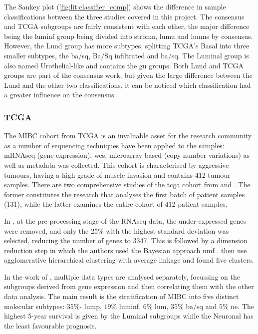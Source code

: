 The Sankey plot (\cref{fig:lit:classifier_comp}) shows the difference in sample classifications between the three studies covered in this project. The consensus and TCGA subgroups are fairly consistent with each other, the major difference being the \acrfull{luminf} group being divided into \acrfull{stroma}, \acrfull{lumu} and \acrfull{lumns} by consensus. However, the Lund group has more subtypes, splitting TCGA's Basal into three smaller subtypes, the \acrfull{ba/sq}, Ba/Sq infiltrated and \acrfull{ba/sq}. The Luminal group is also named Urothelial-like and contains the \acrfull{gu} groups. Both Lund and TCGA groups are part of the consensus work, but given the large difference between the Lund and the other two classifications, it can be noticed which classification had a greater influence on the consensus.


\subsubsection*{TCGA} \label{s:lit:tcga_mibc}

The MIBC cohort from TCGA is an invaluable asset for the research community as a number of sequencing techniques have been applied to the samples: mRNAseq (gene expression), \acrfull{wes}, microarray-based (copy number variations) as well as metadata was collected. This cohort is characterised by aggressive tumours, having a high grade of muscle invasion and contains 412 tumour samples. There are two comprehensive studies of the \acrlong{tcga} cohort from \citet{Tcga2014-dr} and \citet{Robertson2017-mg}. The former constitutes the research that analyses the first batch of patient samples (131), while the latter examines the entire cohort of 412 patient samples. 

In \citet{Robertson2017-mg}, at the pre-processing stage of the RNAseq data, the under-expressed genes were removed, and only the 25\% with the highest standard deviation was selected, reducing the number of genes to 3347. This is followed by a dimension reduction step in which the authors used the Bayesian approach \acrfull{nmf} \citep{Schmidt2009-zh}. \citet{Robertson2017-mg} then use agglomerative hierarchical clustering with average linkage and found five clusters.

In the work of \citet{Robertson2017-mg}, multiple data types are analysed separately, focussing on the subgroups derived from gene expression and then correlating them with the other data analysis. The main result is the stratification of MIBC into five distinct molecular subtypes: $35\%$- \acrfull{lump}, $19\%$ \acrfull{luminf}, $6\%$ \acrfull{lum}, $35\%$ \acrfull{ba/sq} and $5\%$ \acrfull{ne}. The highest 5-year survival is given by the Luminal subgroups while the Neuronal has the least favourable prognosis. 

